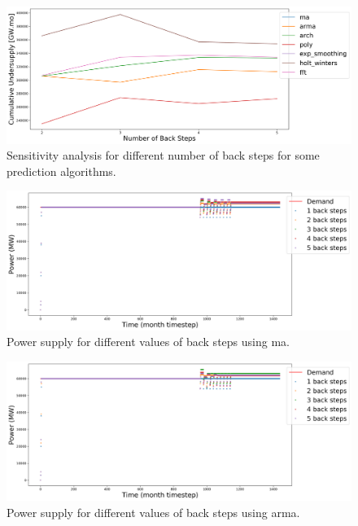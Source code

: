 \documentclass[11pt]{article}
\begin{document}
\begin{figure}[H]
	\centering
	\includegraphics[width=\textwidth]{23-figures/23-sens-backs.png} 
	\hfill
	\caption{Sensitivity analysis for different number of back steps for some prediction algorithms.}
	\label{fig:23-backs}
\end{figure}

\begin{figure}[H]
	\centering
	\includegraphics[width=\textwidth]{23-figures/23-power-buffer0-ma-back.png} 
	\hfill
	\caption{Power supply for different values of back steps using ma.}
	\label{fig:23-back-ma}
\end{figure}

\begin{figure}[H]
	\centering
	\includegraphics[width=\textwidth]{23-figures/23-power-buffer0-arma-back.png} 
	\hfill
	\caption{Power supply for different values of back steps using arma.}
	\label{fig:23-back-arma}
\end{figure}
\end{document}

